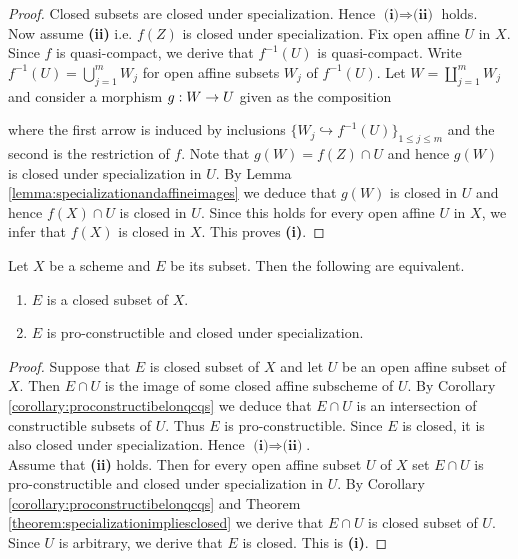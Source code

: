 \begin{proof}
Closed subsets are closed under specialization. Hence $\textbf{(i)}\Rightarrow \textbf{(ii)}$ holds.\\
Now assume \textbf{(ii)} i.e. $f(Z)$ is closed under specialization. Fix open affine $U$ in $X$. Since $f$ is quasi-compact, we derive that $f^{-1}(U)$ is quasi-compact. Write $f^{-1}(U) = \bigcup_{j=1}^mW_j$ for open affine subsets $W_j$ of $f^{-1}(U)$. Let $W = \coprod_{j=1}^mW_j$ and consider a morphism $g:W\rightarrow U$ given as the composition
\begin{center}
\end{center}
where the first arrow is induced by inclusions $\big\{W_j\hookrightarrow f^{-1}(U)\big\}_{1\leq j\leq m}$ and the second is the restriction of $f$. Note that $g(W) = f(Z)\cap U$ and hence $g(W)$ is closed under specialization in $U$. By Lemma \ref{lemma:specializationandaffineimages} we deduce that $g(W)$ is closed in $U$ and hence $f(X)\cap U$ is closed in $U$. Since this holds for every open affine $U$ in $X$, we infer that $f(X)$ is closed in $X$. This proves \textbf{(i)}.
\end{proof}

\begin{corollary}\label{corollary:characterizationofclosedsets}
Let $X$ be a scheme and $E$ be its subset. Then the following are equivalent.
\begin{enumerate}[label=\emph{\textbf{(\roman*)}}, leftmargin=*]
\item $E$ is a closed subset of $X$.
\item $E$ is pro-constructible and closed under specialization.
\end{enumerate}
\end{corollary}
\begin{proof}
Suppose that $E$ is closed subset of $X$ and let $U$ be an open affine subset of $X$. Then $E\cap U$ is the image of some closed affine subscheme of $U$. By Corollary \ref{corollary:proconstructibelonqcqs} we deduce that $E\cap U$ is an intersection of constructible subsets of $U$. Thus $E$ is pro-constructible. Since $E$ is closed, it is also closed under specialization. Hence $\textbf{(i)}\Rightarrow \textbf{(ii)}$.\\
Assume that \textbf{(ii)} holds. Then for every open affine subset $U$ of $X$ set $E\cap U$ is pro-constructible and closed under specialization in $U$. By Corollary \ref{corollary:proconstructibelonqcqs} and Theorem \ref{theorem:specializationimpliesclosed} we derive that $E\cap U$ is closed subset of $U$. Since $U$ is arbitrary, we derive that $E$ is closed. This is \textbf{(i)}.
\end{proof}

